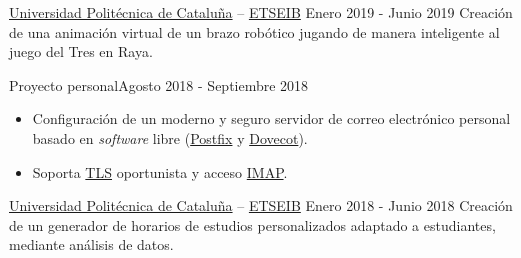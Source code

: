 \documentclass[10pt, a4paper, ragged2e]{altacv}
\begin{document}
\divider

{\href{https://upc.edu}{Universidad Politécnica de Cataluña} --
\href{https://etseib.upc.edu}{ETSEIB}}
{Enero 2019 - Junio 2019}{}
Creación de una animación virtual de un brazo robótico jugando de manera
inteligente al juego del Tres en Raya.

\divider

{Proyecto personal}{Agosto 2018 - Septiembre 2018}{}
\begin{itemize}
  \item Configuración de un moderno y seguro servidor de correo electrónico
  personal basado en \textit{software} libre
  (\href{http://www.postfix.org/}{Postfix} y
  \href{https://www.dovecot.org/}{Dovecot}).
  \item Soporta \href{https://es.wikipedia.org/wiki/Transport_Layer_Security}{TLS}
  oportunista y acceso
  \href{https://es.wikipedia.org/wiki/Protocolo_de_acceso_a_mensajes_de_Internet}
  {IMAP}.
\end{itemize}

\divider

{\href{https://upc.edu}{Universidad Politécnica de Cataluña} --
\href{https://etseib.upc.edu}{ETSEIB}}
{Enero 2018 - Junio 2018}{}
Creación de un generador de horarios de estudios personalizados adaptado a
estudiantes, mediante análisis de datos.


\medskip


\end{document}
